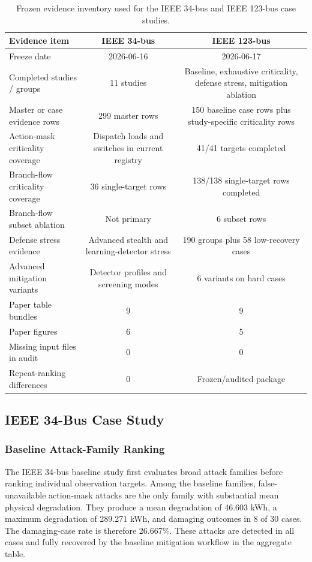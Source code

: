 \begin{table}[t]
\centering
\caption{Frozen evidence inventory used for the IEEE 34-bus and IEEE 123-bus case studies.}
\label{tab:evidence_inventory}
\scriptsize
\begin{tabular}{lcc}
\hline
Evidence item & IEEE 34-bus & IEEE 123-bus \\
\hline
Freeze date & 2026-06-16 & 2026-06-17 \\
Completed studies / groups & 11 studies & Baseline, exhaustive criticality, defense stress, mitigation ablation \\
Master or case evidence rows & 299 master rows & 150 baseline case rows plus study-specific criticality rows \\
Action-mask criticality coverage & Dispatch loads and switches in current registry & 41/41 targets completed \\
Branch-flow criticality coverage & 36 single-target rows & 138/138 single-target rows completed \\
Branch-flow subset ablation & Not primary & 6 subset rows \\
Defense stress evidence & Advanced stealth and learning-detector stress & 190 groups plus 58 low-recovery cases \\
Advanced mitigation variants & Detector profiles and screening modes & 6 variants on hard cases \\
Paper table bundles & 9 & 9 \\
Paper figures & 6 & 5 \\
Missing input files in audit & 0 & 0 \\
Repeat-ranking differences & 0 & Frozen/audited package \\
\hline
\end{tabular}
\end{table}

\subsection{IEEE 34-Bus Case Study}
\label{subsec:ieee34_results}

\subsubsection{Baseline Attack-Family Ranking}
\label{subsubsec:ieee34_baseline_families}

The IEEE 34-bus baseline study first evaluates broad attack families before ranking individual observation targets. Among the baseline families, false-unavailable action-mask attacks are the only family with substantial mean physical degradation. They produce a mean degradation of 46.603 kWh, a maximum degradation of 289.271 kWh, and damaging outcomes in 8 of 30 cases. The damaging-case rate is therefore 26.667\%. These attacks are detected in all cases and fully recovered by the baseline mitigation workflow in the aggregate table.

